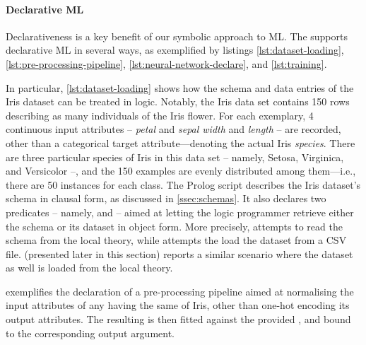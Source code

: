 \documentclass{article}
\begin{document}
\paragraph{Declarative ML}
%
Declarativeness is a key benefit of our symbolic approach to ML.
%
The \mllib{} supports declarative ML in several ways, as exemplified by listings \ref{lst:dataset-loading}, \ref{lst:pre-processing-pipeline}, \ref{lst:neural-network-declare}, and \ref{lst:training}.


In particular, \cref{lst:dataset-loading} shows how the schema and data entries of the Iris dataset can be treated in logic.
%
Notably, the Iris data set contains 150 rows describing as many individuals of the Iris flower.
%
For each exemplary, 4 continuous input attributes -- \emph{petal} and \emph{sepal width} and \emph{length} -- are recorded, other than a categorical target attribute---denoting the actual Iris \emph{species}.
%
There are three particular species of Iris in this data set -- namely, Setosa, Virginica, and Versicolor --, and the 150 examples are evenly distributed among them---i.e., there are 50 instances for each class.
%
The Prolog script describes the Iris dataset's schema in clausal form, as discussed in \cref{ssec:schemas}.
%
It also declares two predicates -- namely,  and  -- aimed at letting the logic programmer retrieve either the schema or its dataset in object form.
%
More precisely,  attempts to read the schema from the local theory, while  attempts the load the dataset from a CSV file.
%
 (presented later in this section) reports a similar scenario where the dataset as well is loaded from the local theory.

 exemplifies the declaration of a pre-processing pipeline aimed at normalising the input attributes of any  having the same  of Iris, other than one-hot encoding its output attributes.
%
The resulting  is then fitted against the provided , and bound to the corresponding output argument.
\end{document}
